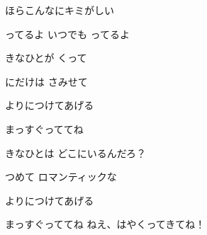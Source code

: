 \documentclass[14pt]{ltjsarticle}
\begin{document}
{  ほらこんなにキミがしい
  \jisho{}

  ってるよ いつでも ってるよ
  \jisho{}

\item
  きなひとが くって
  \jisho{}

  にだけは さみせて
  \jisho{}

  よりにつけてあげる
  \jisho{}


  まっすぐっててね
  \jisho{}

\item
  きなひとは どこにいるんだろ？
  \jisho{}

  つめて ロマンティックな
  \jisho{}

  よりにつけてあげる
  \jisho{}

  
まっすぐっててね ねえ、はやくってきてね！
  \jisho{}

}
\end{document}
